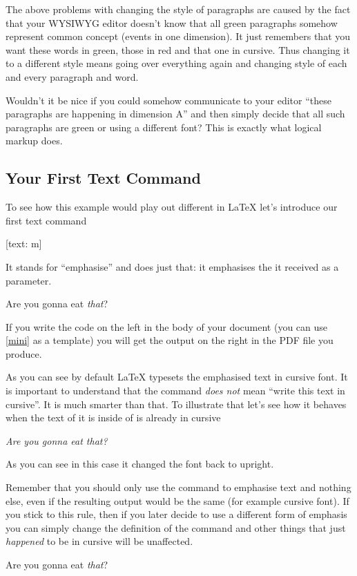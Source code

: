 The above problems with changing the style of paragraphs are caused by the fact
that your WYSIWYG editor doesn't know that all green paragraphs somehow
represent common concept (events in one dimension). It just remembers that you
want these words in green, those in red and that one in cursive. Thus changing
it to a different style means going over everything again and changing style of
each and every paragraph and word.

Wouldn't it be nice if you could somehow communicate to your editor
\enquote{these paragraphs are happening in dimension A} and then simply decide
that all such paragraphs are green or using a different font? This is exactly
what logical markup does.

\subsection{Your First Text Command}

To see how this example would play out different in \LaTeX{} let's introduce
our first text command
\begin{lscommand}
  [text: m]
\end{lscommand}
It stands for \enquote{emphasise} and does just that: it emphasises the
 it received as a parameter.
\begin{example}
Are you gonna eat \emph{that}?
\end{example}
If you write the code on the left in the body of your document (you can use
\autoref{mini} as a template) you will get the output on the right in the
PDF file you produce.

As you can see by default \LaTeX{} typesets the emphasised text in cursive
font. It is important to understand that the  command \emph{does not}
mean \enquote{write this text in cursive}. It is much smarter than that. To
illustrate that let's see how it behaves when the text of it is inside of is
already in cursive
\begin{example}
  \itshape%
Are you gonna eat \emph{that}?
\end{example}
As you can see in this case it changed the font back to upright.

Remember that you should only use the  command to emphasise text and
nothing else, even if the resulting output would be the same (for example
cursive font). If you stick to this rule, then if you later decide to use a
different form of emphasis you can simply change the definition of the
 command and other things that just \emph{happened} to be in cursive
will be unaffected.
\begin{example}
  \RenewCommandCopy{\emph}{\strong}%
Are you gonna eat \emph{that}?
\end{example}

